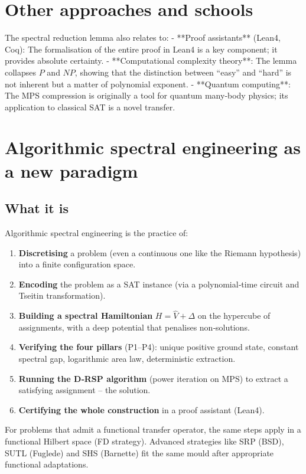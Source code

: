 \documentclass[11pt,a4paper]{article}
\begin{document}
\section{Other approaches and schools}

The spectral reduction lemma also relates to:
- **Proof assistants** (Lean4, Coq): The formalisation of the entire proof in Lean4 is a key component; it provides absolute certainty.
- **Computational complexity theory**: The lemma collapses \(P\) and \(NP\), showing that the distinction between “easy” and “hard” is not inherent but a matter of polynomial exponent.
- **Quantum computing**: The MPS compression is originally a tool for quantum many‑body physics; its application to classical SAT is a novel transfer.

\section{Algorithmic spectral engineering as a new paradigm}

\subsection{What it is}

Algorithmic spectral engineering is the practice of:

\begin{enumerate}
\item \textbf{Discretising} a problem (even a continuous one like the Riemann hypothesis) into a finite configuration space.
\item \textbf{Encoding} the problem as a SAT instance (via a polynomial‑time circuit and Tseitin transformation).
\item \textbf{Building a spectral Hamiltonian} \(H = \hat{V} + \Delta\) on the hypercube of assignments, with a deep potential that penalises non‑solutions.
\item \textbf{Verifying the four pillars} (P1–P4): unique positive ground state, constant spectral gap, logarithmic area law, deterministic extraction.
\item \textbf{Running the D‑RSP algorithm} (power iteration on MPS) to extract a satisfying assignment – the solution.
\item \textbf{Certifying the whole construction} in a proof assistant (Lean4).
\end{enumerate}

For problems that admit a functional transfer operator, the same steps apply in a functional Hilbert space (FD strategy). Advanced strategies like SRP (BSD), SUTL (Fuglede) and SHS (Barnette) fit the same mould after appropriate functional adaptations.
\end{document}

